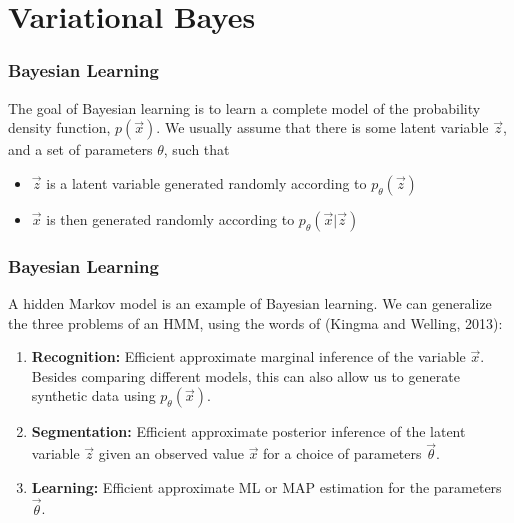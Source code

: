 \documentclass{beamer}
\begin{document}
\section{Variational Bayes}
\setcounter{subsection}{1}

\begin{frame}
  \frametitle{Bayesian Learning}

  The goal of Bayesian learning is to learn a complete model of the
  probability density function, $p(\vec{x})$.  We usually assume that
  there is some latent variable $\vec{z}$, and a set of parameters
  $\theta$, such that
  \begin{itemize}
  \item $\vec{z}$ is a latent variable generated randomly according to
    $p_\theta(\vec{z})$
  \item $\vec{x}$ is then generated randomly according to
    $p_\theta(\vec{x}|\vec{z})$
  \end{itemize}
\end{frame}

\begin{frame}
  \frametitle{Bayesian Learning}

  A hidden Markov model is an example of Bayesian learning. We can
  generalize the three problems of an HMM, using the words of (Kingma
  and Welling, 2013):
  \begin{enumerate}
  \item {\bf Recognition:} Efficient approximate
    marginal inference of the variable $\vec{x}$.  Besides comparing
    different models, this can also allow us to generate synthetic
    data using $p_\theta(\vec{x})$.
  \item {\bf Segmentation:} Efficient approximate posterior inference
    of the latent variable $\vec{z}$ given an observed value $\vec{x}$
    for a choice of parameters $\vec\theta$.
  \item {\bf Learning:} Efficient approximate ML or MAP estimation for
    the parameters $\vec\theta$.
  \end{enumerate}
\end{frame}
\end{document}
